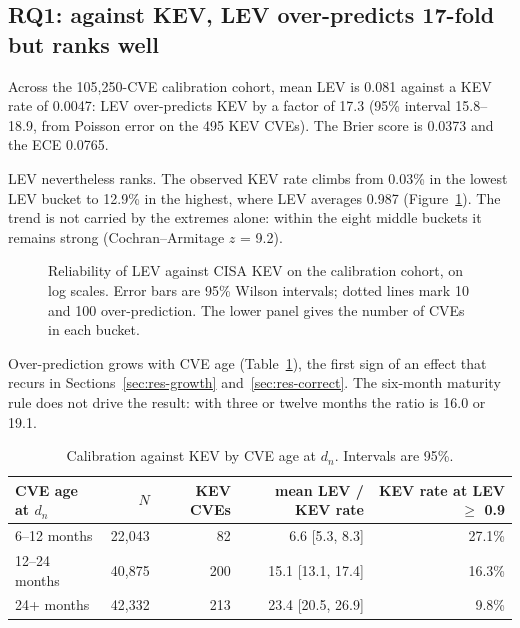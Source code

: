 \subsection{RQ1: against KEV, LEV over-predicts 17-fold but ranks well}\label{sec:res-calib}

Across the 105,250-CVE calibration cohort, mean LEV is 0.081 against a KEV
rate of 0.0047: LEV over-predicts KEV by a factor of 17.3 (95\% interval
15.8--18.9, from Poisson error on the 495 KEV CVEs). The Brier score is 0.0373
and the ECE 0.0765.

LEV nevertheless ranks. The observed KEV rate climbs from 0.03\% in the lowest
LEV bucket to 12.9\% in the highest, where LEV averages 0.987
(Figure~\ref{fig:reliability}). The trend is not carried by the extremes alone:
within the eight middle buckets it remains strong (Cochran--Armitage $z$ = 9.2).

\begin{figure}[t]
\centering
{}
\caption{Reliability of LEV against CISA KEV on the calibration cohort, on log
scales. Error bars are 95\% Wilson intervals; dotted lines mark 10\x{} and
100\x{} over-prediction. The lower panel gives the number of CVEs in each
bucket.}\label{fig:reliability}
\end{figure}

Over-prediction grows with CVE age (Table~\ref{tab:age}), the first sign of an
effect that recurs in Sections~\ref{sec:res-growth} and~\ref{sec:res-correct}.
The six-month maturity rule does not drive the result: with three or twelve
months the ratio is 16.0 or 19.1.

\begin{table}[t]
\centering\small
\caption{Calibration against KEV by CVE age at $d_n$. Intervals are
95\%.}\label{tab:age}
\begin{tabular}{@{}lrrrr@{}}
\toprule
CVE age at $d_n$ & $N$ & KEV CVEs & mean LEV / KEV rate & KEV rate at LEV $\ge$ 0.9 \\
\midrule
6--12 months & 22,043 & 82 & 6.6\x{} [5.3, 8.3] & 27.1\% \\
12--24 months & 40,875 & 200 & 15.1\x{} [13.1, 17.4] & 16.3\% \\
24+ months & 42,332 & 213 & 23.4\x{} [20.5, 26.9] & 9.8\% \\
\bottomrule
\end{tabular}
\end{table}


